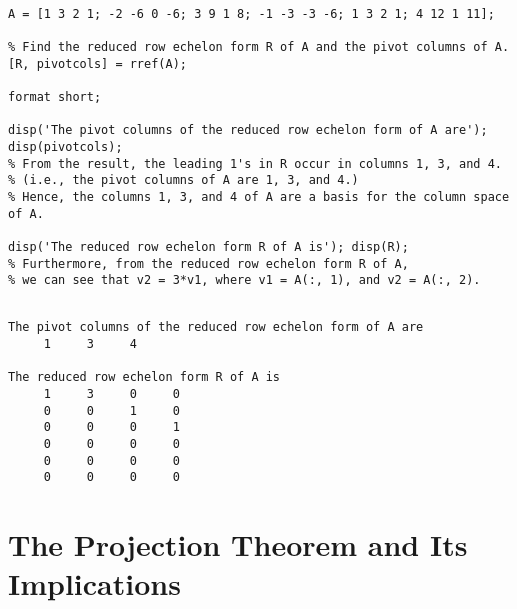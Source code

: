 \begin{sol}
\begin{verbatim}

A = [1 3 2 1; -2 -6 0 -6; 3 9 1 8; -1 -3 -3 -6; 1 3 2 1; 4 12 1 11];

% Find the reduced row echelon form R of A and the pivot columns of A.
[R, pivotcols] = rref(A);

format short;

disp('The pivot columns of the reduced row echelon form of A are');
disp(pivotcols);
% From the result, the leading 1's in R occur in columns 1, 3, and 4.
% (i.e., the pivot columns of A are 1, 3, and 4.)
% Hence, the columns 1, 3, and 4 of A are a basis for the column space of A.

disp('The reduced row echelon form R of A is'); disp(R);
% Furthermore, from the reduced row echelon form R of A,
% we can see that v2 = 3*v1, where v1 = A(:, 1), and v2 = A(:, 2).
\end{verbatim}


\begin{outputs}
\begin{verbatim}

The pivot columns of the reduced row echelon form of A are
     1     3     4

The reduced row echelon form R of A is
     1     3     0     0
     0     0     1     0
     0     0     0     1
     0     0     0     0
     0     0     0     0
     0     0     0     0
\end{verbatim}
\end{outputs}

\end{sol}








\section{The Projection Theorem and Its Implications}



